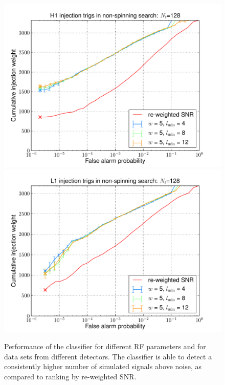\documentclass[a0,portrait]{a0poster}
\begin{document}
\begin{textblock}{8}
\begin{figure}\label{ROC_Plots_RF}
{
  \includegraphics[scale=0.88]{images/H1-merged_nospin_ROC_t128_w5_l4-8-12_POSTER.pdf}
  }
\hspace{-1cm}
{
  \includegraphics[scale=0.88]{images/L1-merged_nospin_ROC_t128_w5_l4-8-12_POSTER.pdf}
  }
\hspace{-2cm}
\vspace*{-1cm}
\caption{Performance of the classifier for different RF parameters and for data sets from different detectors.  The classifier is able to detect a consistently higher number of simulated signals above noise, as compared to ranking by re-weighted SNR.}
\end{figure}

\end{textblock}
\end{document}
